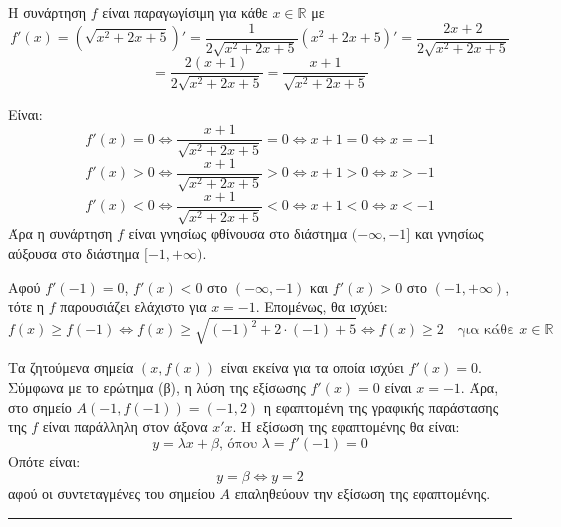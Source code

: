 \begin{alist}
\item Η συνάρτηση $f$ είναι παραγωγίσιμη για κάθε $x \in \mathbb{R}$ με
\[ f'(x) = \left(\sqrt{x^2 + 2x + 5}\right)' = \frac{1}{2\sqrt{x^2 + 2x + 5}}(x^2 + 2x + 5)' = \frac{2x + 2}{2\sqrt{x^2 + 2x + 5}} \]
\[ = \frac{2(x + 1)}{2\sqrt{x^2 + 2x + 5}} = \frac{x + 1}{\sqrt{x^2 + 2x + 5}} \]

\item Είναι:
\[ f'(x) = 0 \Leftrightarrow \frac{x + 1}{\sqrt{x^2 + 2x + 5}} = 0 \Leftrightarrow x + 1 = 0 \Leftrightarrow x = -1 \]
\[ f'(x) > 0 \Leftrightarrow \frac{x + 1}{\sqrt{x^2 + 2x + 5}} > 0 \Leftrightarrow x + 1 > 0 \Leftrightarrow x > -1 \]
\[ f'(x) < 0 \Leftrightarrow \frac{x + 1}{\sqrt{x^2 + 2x + 5}} < 0 \Leftrightarrow x + 1 < 0 \Leftrightarrow x < -1 \]
Άρα η συνάρτηση $f$ είναι γνησίως φθίνουσα στο διάστημα $(-\infty, -1]$ και γνησίως αύξουσα στο διάστημα $[-1, +\infty)$.

\item Αφού $f'(-1) = 0$, $f'(x) < 0$ στο $(-\infty, -1)$ και $f'(x) > 0$ στο $(-1, +\infty)$, τότε η $f$ παρουσιάζει ελάχιστο για $x = -1$. Επομένως, θα ισχύει:
\[ f(x) \ge f(-1) \Leftrightarrow f(x) \ge \sqrt{(-1)^2 + 2 \cdot (-1) + 5} \Leftrightarrow f(x) \ge 2 \quad \text{για κάθε } x \in \mathbb{R} \]

\item Τα ζητούμενα σημεία $(x, f(x))$ είναι εκείνα για τα οποία ισχύει $f'(x) = 0$. Σύμφωνα με το ερώτημα (β), η λύση της εξίσωσης $f'(x) = 0$ είναι $x = -1$. Άρα, στο σημείο $A(-1, f(-1)) = (-1, 2)$ η εφαπτομένη της γραφικής παράστασης της $f$ είναι παράλληλη στον άξονα $x'x$. Η εξίσωση της εφαπτομένης θα είναι:
\[ y = \lambda x + \beta \text{, όπου } \lambda = f'(-1) = 0 \]
Οπότε είναι:
\[ y = \beta \Leftrightarrow y = 2 \]
αφού οι συντεταγμένες του σημείου $A$ επαληθεύουν την εξίσωση της εφαπτομένης.
\end{alist}
\vspace{6mm}
\noindent\rule{\textwidth}{0.4pt}
\vspace{6mm}


